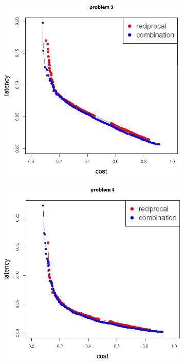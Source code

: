 \begin{figure}[h!]
\begin{subfigure}{0.49\textwidth}
       \includegraphics[width=\textwidth]{pics/combination_problem3.png}
	   \caption{}
   \end{subfigure}
   \begin{subfigure}{0.49\textwidth}
       \includegraphics[width=\textwidth]{pics/combination_problem4.png}

\end{subfigure}
\end{figure}
